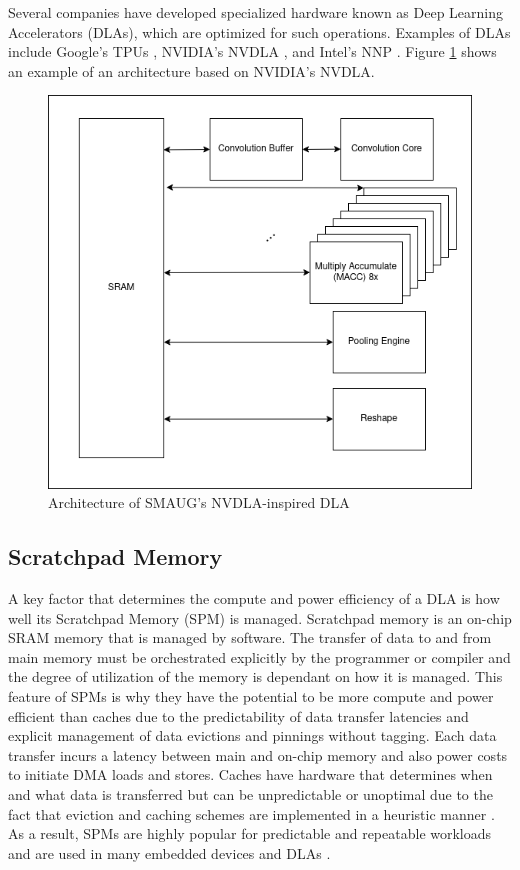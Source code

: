 Several companies have developed specialized hardware known as Deep Learning
Accelerators (DLAs), which are optimized for such operations. Examples of DLAs
include Google's TPUs \cite{tensorflow}, NVIDIA's NVDLA \cite{nvdla}, and Intel's NNP \cite{nnp}. Figure \ref{fig:nvdla}
shows an example of an architecture based on NVIDIA's NVDLA.


\begin{figure}[thb!]
\centering
\includegraphics[scale=0.5]{Figures/nvdla.png}
\decoRule
\caption[NVDLA Inspired DLA Architecture Diagram]{Architecture of SMAUG's NVDLA-inspired DLA}
\label{fig:nvdla}
\end{figure}


\subsection{Scratchpad Memory}
A key factor that determines the compute and power efficiency of a DLA is how
well its Scratchpad Memory (SPM) is managed. Scratchpad memory is an on-chip
SRAM memory that is managed by software. The transfer of data to and from main
memory must be orchestrated explicitly by the programmer or compiler and the
degree of utilization of the memory is dependant on how it is managed.  This
feature of SPMs is why they have the potential to be more compute and power
efficient than caches due to the predictability of data transfer latencies and
explicit management of data evictions and pinnings without tagging.  Each data
transfer incurs a latency between main and on-chip memory and also power costs
to initiate DMA loads and stores. Caches have hardware that determines when and
what data is transferred but can be unpredictable or unoptimal due to the fact
that eviction and caching schemes are implemented in a heuristic manner
\cite{manyCore}. As a result, SPMs are highly popular for predictable and
repeatable workloads and are used in many embedded devices \cite{graphColoring}
and DLAs \cite{onsram}.


